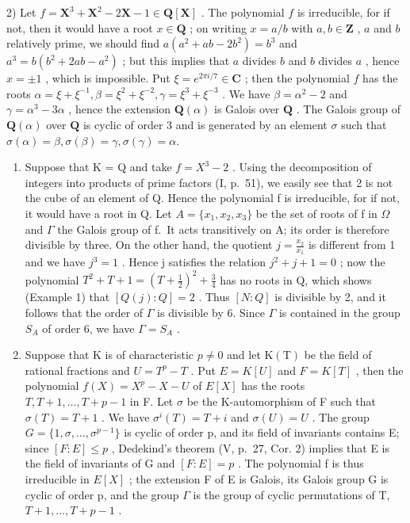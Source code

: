 2) Let \(f = \mathbf{X}^3 + \mathbf{X}^2 - 2\mathbf{X} - 1 \in \mathbf{Q}[\mathbf{X}]\) . The polynomial \(f\) is irreducible, for if not, then it would have a root \(x \in \mathbf{Q}\) ; on writing \(x = a / b\) with \(a, b \in \mathbf{Z}\) , \(a\) and \(b\) relatively prime, we should find \(a(a^2 + ab - 2b^2) = b^3\) and \(a^3 = b(b^2 + 2ab - a^2)\) ; but this implies that \(a\) divides \(b\) and \(b\) divides \(a\) , hence \(x = \pm 1\) , which is impossible. Put \(\xi = e^{2\pi i / 7} \in \mathbf{C}\) ; then the polynomial \(f\) has the roots \(\alpha = \xi + \xi^{-1}, \beta = \xi^2 + \xi^{-2}, \gamma = \xi^3 + \xi^{-3}\) . We have \(\beta = \alpha^2 - 2\) and \(\gamma = \alpha^3 - 3\alpha\) , hence the extension \(\mathbf{Q}(\alpha)\) is Galois over \(\mathbf{Q}\) . The Galois group of \(\mathbf{Q}(\alpha)\) over \(\mathbf{Q}\) is cyclic of order 3 and is generated by an element \(\sigma\) such that \(\sigma(\alpha) = \beta, \sigma(\beta) = \gamma, \sigma(\gamma) = \alpha.\)

\begin{enumerate}
\def\labelenumi{\arabic{enumi})}
\setcounter{enumi}{2}
\item
  Suppose that K = Q and take \(f = X^{3} - 2\) . Using the decomposition of integers into products of prime factors (I, p.~51), we easily see that 2 is not the cube of an element of Q. Hence the polynomial f is irreducible, for if not, it would have a root in Q. Let \(A = \{x_{1}, x_{2}, x_{3}\}\) be the set of roots of f in \(\Omega\) and \(\Gamma\) the Galois group of f.~It acts transitively on A; its order is therefore divisible by three. On the other hand, the quotient \(j = \frac{x_{2}}{x_{1}}\) is different from 1 and we have \(j^{3} = 1\) . Hence j satisfies the relation \(j^{2} + j + 1 = 0\) ; now the polynomial \(T^{2} + T + 1 = \left(T + \frac{1}{2}\right)^{2} + \frac{3}{4}\) has no roots in Q, which shows (Example 1) that \([Q(j): Q] = 2\) . Thus \([N: Q]\) is divisible by 2, and it follows that the order of \(\Gamma\) is divisible by 6. Since \(\Gamma\) is contained in the group \(S_{A}\) of order 6, we have \(\Gamma = S_{A}\) .
\item
  Suppose that K is of characteristic \(p \neq 0\) and let \(\mathrm{K}(\mathrm{T})\) be the field of rational fractions and \(U = T^{p} - T\) . Put \(E = K[U]\) and \(F = K[T]\) , then the polynomial \(f(X) = X^{p} - X - U\) of \(E[X]\) has the roots \(T, T + 1, \ldots, T + p - 1\) in F. Let \(\sigma\) be the K-automorphism of F such that \(\sigma(T) = T + 1\) . We have \(\sigma^{i}(T) = T + i\) and \(\sigma(U) = U\) . The group \(G = \{1, \sigma, \ldots, \sigma^{p-1}\}\) is cyclic of order p, and its field of invariants contains E; since \([F: E] \leqslant p\) , Dedekind's theorem (V, p.~27, Cor. 2) implies that E is the field of invariants of G and \([F: E] = p\) . The polynomial f is thus irreducible in \(E[X]\) ; the extension F of E is Galois, its Galois group G is cyclic of order p, and the group \(\Gamma\) is the group of cyclic permutations of T, \(T + 1, \ldots, T + p - 1\) .
\end{enumerate}

